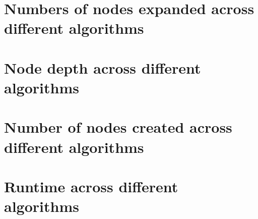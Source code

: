 \documentclass[letterpaper,12pt]{article}
\begin{document}
\begin{appendices}
\newpage
\section{Numbers of nodes expanded across different algorithms}
\label{sec:appendix-nodes-expanded}


\section{Node depth across different algorithms}
\label{sec:appendix-node-depth}


\newpage
\section{Number of nodes created across different algorithms}
\label{sec:appendix-nodes-created}


\section{Runtime across different algorithms}
\label{sec:appendix-runtime}


\newpage



\end{appendices}
\end{document}
